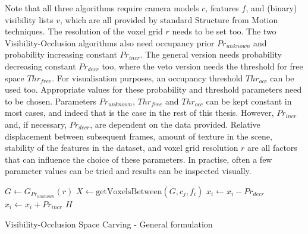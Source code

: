 Note that all three algorithms require camera models $c$, features $f$, and (binary) visibility lists $v$, which are all provided by standard Structure from Motion techniques. The resolution of the voxel grid $r$ needs to be set too. The two Visibility-Occlusion algorithms also need occupancy prior $Pr_{unknown}$ and probability increasing constant $Pr_{incr}$. The general version needs probability decreasing constant $Pr_{decr}$ too, where the veto version needs the threshold for free space $Thr_{free}$. For visualisation purposes, an occupancy threshold $Thr_{occ}$ can be used too. Appropriate values for these probability and threshold parameters need to be chosen. Parameters $Pr_{unknown}$, $Thr_{free}$ and $Thr_{occ}$ can be kept constant in most cases, and indeed that is the case in the rest of this thesis. However, $Pr_{incr}$ and, if necessary, $Pr_{decr}$, are dependent on the data provided. Relative displacement between subsequent frames, amount of texture in the scene, stability of the features in the dataset, and voxel grid resolution $r$ are all factors that can influence the choice of these parameters. In practise, often a few parameter values can be tried and results can be inspected visually.

{\singlespacing
\begin{algorithm}[!h]
  \centering
  \begin{algorithmic}[1]
      \State $G \gets G_{Pr_{unknown}}(r)$ 
           
            \State $X \gets \mathrm{getVoxelsBetween}(G, c_j, f_i)$ 
             
                \State $x_i \gets x_i - Pr_{decr}$ 
              \EndFor
            \Else {}
                \State $x_i \gets x_i + Pr_{incr}$ 
              \EndFor
            \EndIf
          \EndIf
        \EndFor
      \EndFor
      \State \Return $H$
    \EndFunction
  \end{algorithmic}
  \caption{Visibility-Occlusion Space Carving - General formulation}
  \label{alg:vis-occ-carving}
\end{algorithm}
}

